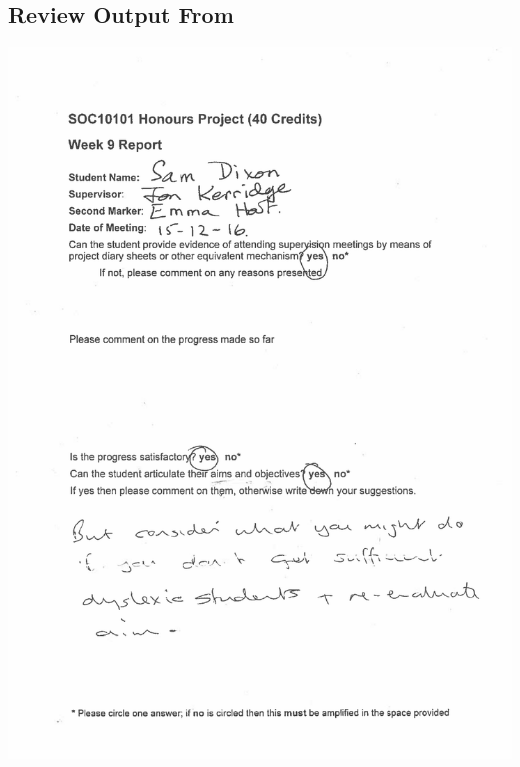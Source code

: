 \begin{appendices}
	\section{Review Output From}
		\includegraphics[width={\textwidth}]{../images/midway_a}

\end{appendices}
